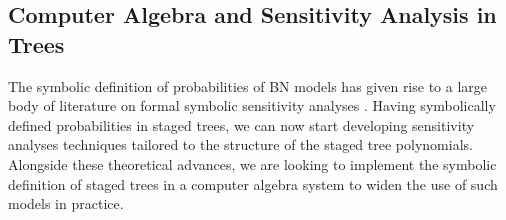 \subsection*{Computer Algebra and Sensitivity Analysis in Trees}
The symbolic definition of probabilities of BN models has given rise to a large body of literature on formal symbolic sensitivity analyses \citep[see e.g.][]{Chan2001,Chan2004}. Having  symbolically defined probabilities in staged trees, we can now start developing sensitivity analyses techniques tailored to the structure of the staged tree polynomials. Alongside these theoretical advances, we are looking to implement the symbolic definition of staged trees in a computer algebra system to widen the use of such models in practice.
  
  \begin{comment} 
\subsection*{Symbolic Model Definition}
In Section \ref{sec:diff} we defined the interpolator polynomial of a staged tree. This is able to capture all the probabilistic information associated to the tree model. Thus, once this polynomial is defined, all inference can be performed over the polynomial. This observation leads us to start looking at classes of models that are only defined polynomially. Such definition could then enable us to identify new classes of probabilistic models that do not have a graphical probabilistic counterpart.
\end{comment}